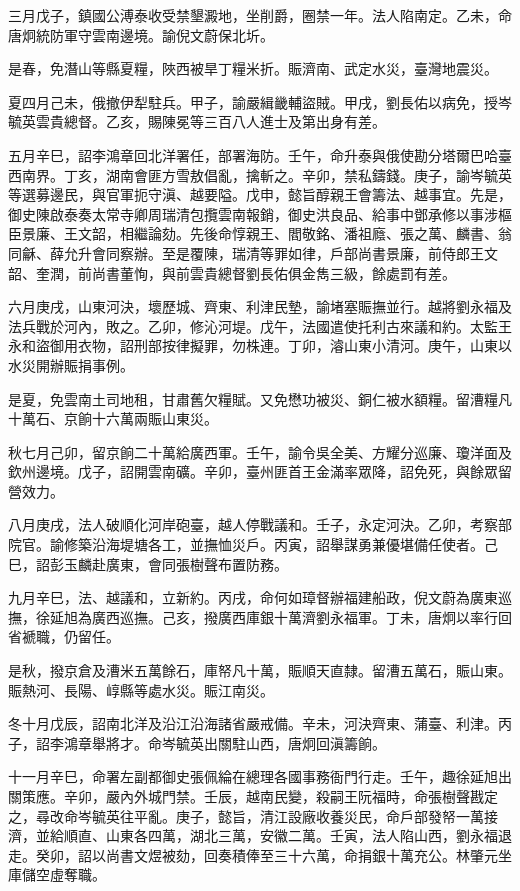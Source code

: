 \begin{pinyinscope}
三月戊子，鎮國公溥泰收受禁墾澱地，坐削爵，圈禁一年。法人陷南定。乙未，命唐炯統防軍守雲南邊境。諭倪文蔚保北圻。

是春，免潛山等縣夏糧，陜西被旱丁糧米折。賑濟南、武定水災，臺灣地震災。

夏四月己未，俄撤伊犁駐兵。甲子，諭嚴緝畿輔盜賊。甲戌，劉長佑以病免，授岑毓英雲貴總督。乙亥，賜陳冕等三百八人進士及第出身有差。

五月辛巳，詔李鴻章回北洋署任，部署海防。壬午，命升泰與俄使勘分塔爾巴哈臺西南界。丁亥，湖南會匪方雪敖倡亂，擒斬之。辛卯，禁私鑄錢。庚子，諭岑毓英等選募邊民，與官軍扼守滇、越要隘。戊申，懿旨醇親王會籌法、越事宜。先是，御史陳啟泰奏太常寺卿周瑞清包攬雲南報銷，御史洪良品、給事中鄧承修以事涉樞臣景廉、王文韶，相繼論劾。先後命惇親王、閻敬銘、潘祖廕、張之萬、麟書、翁同龢、薛允升會同察辦。至是覆陳，瑞清等罪如律，戶部尚書景廉，前侍郎王文韶、奎潤，前尚書董恂，與前雲貴總督劉長佑俱金雋三級，餘處罰有差。

六月庚戌，山東河決，壞歷城、齊東、利津民墊，諭堵塞賑撫並行。越將劉永福及法兵戰於河內，敗之。乙卯，修沁河堤。戊午，法國遣使托利古來議和約。太監王永和盜御用衣物，詔刑部按律擬罪，勿株連。丁卯，濬山東小清河。庚午，山東以水災開辦賑捐事例。

是夏，免雲南土司地租，甘肅舊欠糧賦。又免懋功被災、銅仁被水額糧。留漕糧凡十萬石、京餉十六萬兩賑山東災。

秋七月己卯，留京餉二十萬給廣西軍。壬午，諭令吳全美、方耀分巡廉、瓊洋面及欽州邊境。戊子，詔開雲南礦。辛卯，臺州匪首王金滿率眾降，詔免死，與餘眾留營效力。

八月庚戌，法人破順化河岸砲臺，越人停戰議和。壬子，永定河決。乙卯，考察部院官。諭修築沿海堤塘各工，並撫恤災戶。丙寅，詔舉謀勇兼優堪備任使者。己巳，詔彭玉麟赴廣東，會同張樹聲布置防務。

九月辛巳，法、越議和，立新約。丙戌，命何如璋督辦福建船政，倪文蔚為廣東巡撫，徐延旭為廣西巡撫。己亥，撥廣西庫銀十萬濟劉永福軍。丁未，唐炯以率行回省褫職，仍留任。

是秋，撥京倉及漕米五萬餘石，庫帑凡十萬，賑順天直隸。留漕五萬石，賑山東。賑熱河、長陽、崞縣等處水災。賑江南災。

冬十月戊辰，詔南北洋及沿江沿海諸省嚴戒備。辛未，河決齊東、蒲臺、利津。丙子，詔李鴻章舉將才。命岑毓英出關駐山西，唐炯回滇籌餉。

十一月辛巳，命署左副都御史張佩綸在總理各國事務衙門行走。壬午，趣徐延旭出關策應。辛卯，嚴內外城門禁。壬辰，越南民變，殺嗣王阮福時，命張樹聲戡定之，尋改命岑毓英往平亂。庚子，懿旨，清江設廠收養災民，命戶部發帑一萬接濟，並給順直、山東各四萬，湖北三萬，安徽二萬。壬寅，法人陷山西，劉永福退走。癸卯，詔以尚書文煜被劾，回奏積俸至三十六萬，命捐銀十萬充公。林肇元坐庫儲空虛奪職。


\end{pinyinscope}
